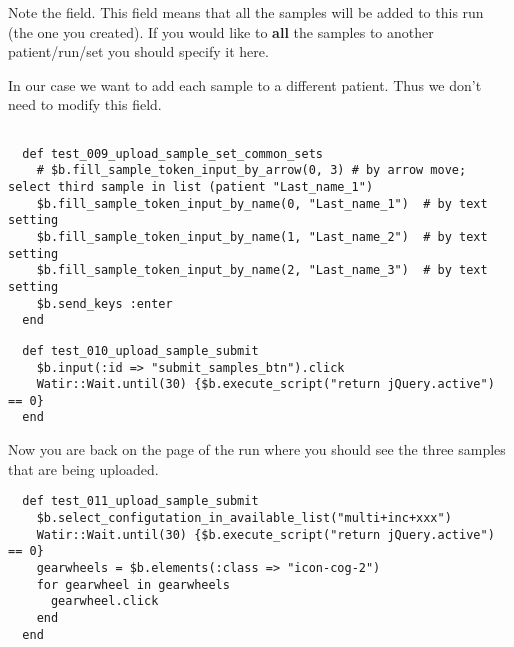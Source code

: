Note the  field. This field means that all the samples will
be added to this run (the one you created). If you would like to \textbf{all}
the samples to another patient/run/set you should specify it here.

In our case we want to add each sample to a different patient. Thus we don't
need to modify this field.

\begin{verbatim}
 
  def test_009_upload_sample_set_common_sets
    # $b.fill_sample_token_input_by_arrow(0, 3) # by arrow move; select third sample in list (patient "Last_name_1")
    $b.fill_sample_token_input_by_name(0, "Last_name_1")  # by text setting
    $b.fill_sample_token_input_by_name(1, "Last_name_2")  # by text setting
    $b.fill_sample_token_input_by_name(2, "Last_name_3")  # by text setting
    $b.send_keys :enter
  end

\end{verbatim}

\begin{verbatim}
  def test_010_upload_sample_submit
    $b.input(:id => "submit_samples_btn").click
    Watir::Wait.until(30) {$b.execute_script("return jQuery.active") == 0}
  end

\end{verbatim}

Now you are back on the page of the run where you should see the three samples
that are being uploaded.

\begin{verbatim}
  def test_011_upload_sample_submit
    $b.select_configutation_in_available_list("multi+inc+xxx")
    Watir::Wait.until(30) {$b.execute_script("return jQuery.active") == 0}
    gearwheels = $b.elements(:class => "icon-cog-2")
    for gearwheel in gearwheels
      gearwheel.click
    end
  end

\end{verbatim}

